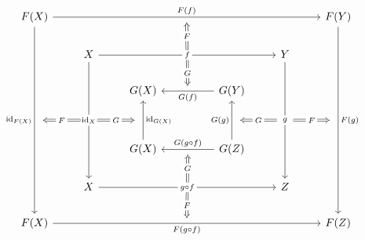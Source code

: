 \documentclass{article}
\begin{document}
\[\begin{tikzcd}
	{F(X)} &&&&&& {F(Y)} \\
	& X &&&& Y \\
	&& {G(X)} && {G(Y)} \\
	\\
	&& {G(X)} && {G(Z)} \\
	& X &&&& Z \\
	{F(X)} &&&&&& {F(Z)}
	\arrow[""{name=0, anchor=center, inner sep=0}, "{F(f)}", from=1-1, to=1-7]
	\arrow[""{name=1, anchor=center, inner sep=0}, "{\id{F(X)}}"', from=1-1, to=7-1]
	\arrow[""{name=2, anchor=center, inner sep=0}, "{F(g)}", from=1-7, to=7-7]
	\arrow[""{name=3, anchor=center, inner sep=0}, "f"{description}, from=2-2, to=2-6]
	\arrow[""{name=4, anchor=center, inner sep=0}, "{\id{X}}"{description}, from=2-2, to=6-2]
	\arrow[""{name=5, anchor=center, inner sep=0}, "g"{description}, from=2-6, to=6-6]
	\arrow[""{name=6, anchor=center, inner sep=0}, "{G(f)}", from=3-5, to=3-3]
	\arrow[""{name=7, anchor=center, inner sep=0}, "{\id{G(X)}}"', from=5-3, to=3-3]
	\arrow[""{name=8, anchor=center, inner sep=0}, "{G(g)}", from=5-5, to=3-5]
	\arrow[""{name=9, anchor=center, inner sep=0}, "{G(g \circ f)}"', from=5-5, to=5-3]
	\arrow[""{name=10, anchor=center, inner sep=0}, "{g \circ f}"{description}, from=6-2, to=6-6]
	\arrow[""{name=11, anchor=center, inner sep=0}, "{F(g \circ f)}"', from=7-1, to=7-7]
	\arrow["F"{description}, shorten <=4pt, shorten >=4pt, Rightarrow, from=3, to=0]
	\arrow["G"{description}, shorten <=7pt, shorten >=7pt, Rightarrow, from=4, to=7]
	\arrow["G"{description}, shorten <=4pt, shorten >=4pt, Rightarrow, from=3, to=6]
	\arrow["F"{description}, shorten <=7pt, shorten >=7pt, Rightarrow, from=4, to=1]
	\arrow["G"{description}, shorten <=7pt, shorten >=7pt, Rightarrow, from=5, to=8]
	\arrow["F"{description}, shorten <=7pt, shorten >=7pt, Rightarrow, from=5, to=2]
	\arrow["G"{description}, shorten <=4pt, shorten >=4pt, Rightarrow, from=10, to=9]
	\arrow["F"{description}, shorten <=4pt, shorten >=4pt, Rightarrow, from=10, to=11]
\end{tikzcd}\]
\end{document}
